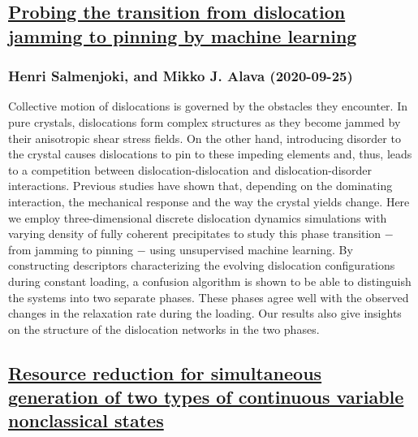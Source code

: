 \subsection*{\href{http://arxiv.org/abs/2009.12082v2}{Probing the transition from dislocation jamming to pinning by machine  learning}}
\subsubsection*{Henri Salmenjoki, and Mikko J. Alava (2020-09-25)}
Collective motion of dislocations is governed by the obstacles they
encounter. In pure crystals, dislocations form complex structures as they
become jammed by their anisotropic shear stress fields. On the other hand,
introducing disorder to the crystal causes dislocations to pin to these
impeding elements and, thus, leads to a competition between
dislocation-dislocation and dislocation-disorder interactions. Previous studies
have shown that, depending on the dominating interaction, the mechanical
response and the way the crystal yields change.
  Here we employ three-dimensional discrete dislocation dynamics simulations
with varying density of fully coherent precipitates to study this phase
transition $-$ from jamming to pinning $-$ using unsupervised machine learning.
By constructing descriptors characterizing the evolving dislocation
configurations during constant loading, a confusion algorithm is shown to be
able to distinguish the systems into two separate phases. These phases agree
well with the observed changes in the relaxation rate during the loading. Our
results also give insights on the structure of the dislocation networks in the
two phases.

\subsection*{\href{http://arxiv.org/abs/2009.12079v1}{Resource reduction for simultaneous generation of two types of  continuous variable nonclassical states}}
